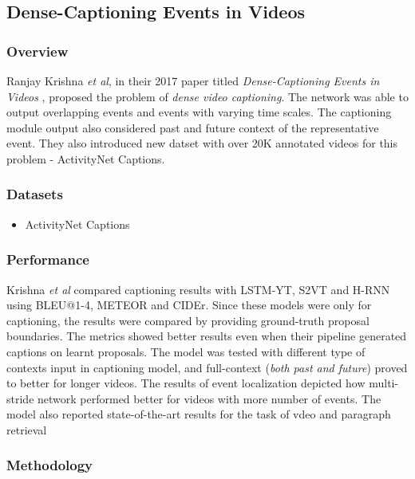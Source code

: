 \subsection{Dense-Captioning Events in Videos}

\subsubsection{Overview}

\par Ranjay Krishna \textit{et al}, in their 2017 paper titled \textit{Dense-Captioning Events in Videos} \cite{krishna2017densecaptioning}, proposed the problem of \textit{dense video captioning}. The network was able to output overlapping events and events with varying time scales. The captioning module output also considered past and future context of the representative event. They also introduced new datset with over 20K annotated videos for this problem - ActivityNet Captions.


\subsubsection{Datasets}
\begin{itemize}
\item ActivityNet Captions
\end{itemize}

\subsubsection{Performance}
\par Krishna \textit{et al} compared captioning results with LSTM-YT\cite{venugopalan2015sequence}, S2VT\cite{venugopalan2015translating} and H-RNN\cite{yu2016video} using BLEU@1-4, METEOR and CIDEr. Since these models were only for captioning, the results were compared by providing ground-truth proposal boundaries. The metrics showed better results even when their pipeline generated captions on learnt proposals. The model was tested with different type of contexts input in captioning model, and full-context (\textit{both past and future}) proved to better for longer videos. The results of event localization depicted how multi-stride network performed better for videos with more number of events. The model also reported state-of-the-art results for the task of vdeo and paragraph retrieval


\subsubsection{Methodology}

